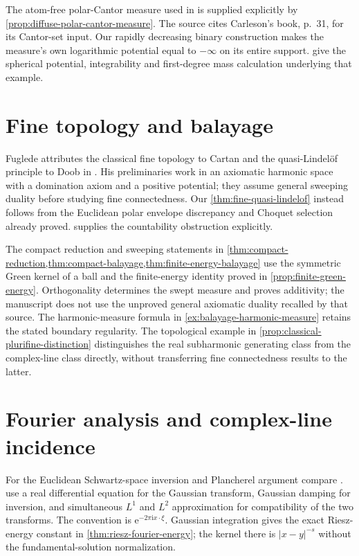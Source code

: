 The atom-free polar-Cantor measure used in \cite[Example~6.1.3, labelled \texttt{ex:BBJ}]{XiaSampleBook} is supplied explicitly by \cref{prop:diffuse-polar-cantor-measure}. The source cites Carleson's book, p.~31, for its Cantor-set input. Our rapidly decreasing binary construction makes the measure's own logarithmic potential equal to $-\infty$ on its entire support.  give the spherical potential, integrability and first-degree mass calculation underlying that example.

\section{Fine topology and balayage}
\label{sec:history-fine}
Fuglede attributes the classical fine topology to Cartan and the quasi-Lindel\"of principle to Doob in \cite[Introduction, p.~227]{Fug71Fine}. His preliminaries \cite[Section 1, pp.~228--230]{Fug71Fine} work in an axiomatic harmonic space with a domination axiom and a positive potential; they assume general sweeping duality before studying fine connectedness. Our \cref{thm:fine-quasi-lindelof} instead follows from the Euclidean polar envelope discrepancy and Choquet selection already proved.  supplies the countability obstruction explicitly.

The compact reduction and sweeping statements in \cref{thm:compact-reduction,thm:compact-balayage,thm:finite-energy-balayage} use the symmetric Green kernel of a ball and the finite-energy identity proved in \cref{prop:finite-green-energy}. Orthogonality determines the swept measure and proves additivity; the manuscript does not use the unproved general axiomatic duality recalled by that source. The harmonic-measure formula in \cref{ex:balayage-harmonic-measure} retains the stated boundary regularity. The topological example in \cref{prop:classical-plurifine-distinction} distinguishes the real subharmonic generating class from the complex-line class directly, without transferring fine connectedness results to the latter.

\section{Fourier analysis and complex-line incidence}
\label{sec:history-fourier-incidence}
For the Euclidean Schwartz-space inversion and Plancherel argument compare \cite[Exercises 38--42, formula (11), Theorem 43 and Exercise 44]{Tao09Fourier}.  use a real differential equation for the Gaussian transform, Gaussian damping for inversion, and simultaneous $L^1$ and $L^2$ approximation for compatibility of the two transforms. The convention is $\mathrm e^{-2\pi\mathrm i x\cdot\xi}$. Gaussian integration gives the exact Riesz-energy constant in \cref{thm:riesz-fourier-energy}; the kernel there is $|x-y|^{-s}$ without the fundamental-solution normalization.

